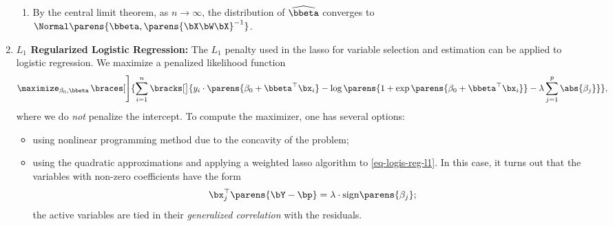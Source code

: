 \documentclass[12pt]{article}
\begin{document}
\begin{enumerate}[label=\textbf{\arabic*.}]
\begin{enumerate}
		\item By the central limit theorem, as $n \to \infty$, the distribution of $\widehat{\bbeta}$ converges to $\Normal \parens{\bbeta, \parens{\bX \bW \bX}^{-1}}$. 
%		
	\end{enumerate}
	
	\item \textbf{$L_1$ Regularized Logistic Regression:} The $L_1$ penalty used in the lasso for variable selection and estimation can be applied to logistic regression. We maximize a penalized likelihood function 
	\begin{align}\label{eq-logis-reg-l1}
		\maximize_{\beta_0, \bbeta} \, \braces[\Bigg]{ \sum_{i=1}^n \bracks[\big]{y_i \cdot \parens{\beta_0 + \bbeta^\top \bx_i} - \log \parens{1 + \exp \parens{\beta_0 + \bbeta^\top \bx_i} } - \lambda \sum_{j=1}^p \abs{\beta_j} }}, 
	\end{align}
	where we do \emph{not} penalize the intercept. To compute the maximizer, one has several options: 
	\begin{itemize}
		\item using nonlinear programming method due to the concavity of the problem; 
		\item using the quadratic approximations and applying a weighted lasso algorithm to \eqref{eq-logis-reg-l1}. In this case, it turns out that the variables with non-zero coefficients have the form 
		\begin{align*}
			\bx_j^\top \parens{\bY - \bp} = \lambda \cdot \mathrm{sign}\parens{\beta_j}; 
		\end{align*}
		the active variables are tied in their \emph{generalized correlation} with the residuals. 
	\end{itemize}
	

\end{enumerate}
\end{document}
